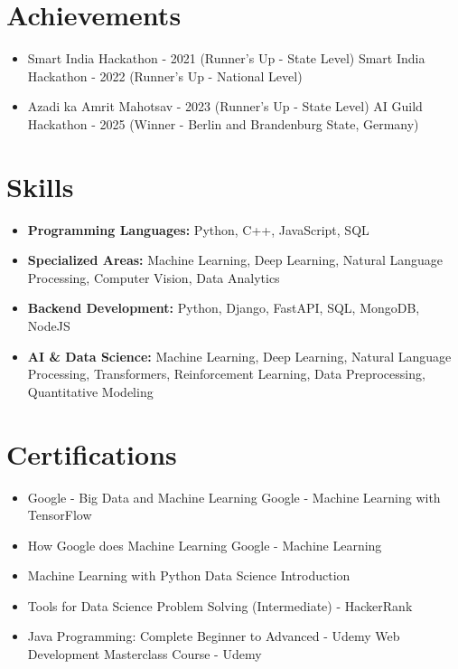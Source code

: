 \documentclass[a4paper,10pt]{article}
\begin{document}
\section*{Achievements}
\begin{itemize}
\item Smart India Hackathon - 2021 (Runner's Up - State Level) \hfill Smart India Hackathon - 2022 (Runner's Up - National Level)
\item Azadi ka Amrit Mahotsav - 2023 (Runner's Up - State Level) \hfill AI Guild Hackathon - 2025 (Winner - Berlin and Brandenburg State, Germany)
\end{itemize}

\section*{Skills}
\begin{itemize}
  \item \textbf{Programming Languages:} Python, C++, JavaScript, SQL
  \item \textbf{Specialized Areas:} Machine Learning, Deep Learning, Natural Language Processing, Computer Vision, Data Analytics
  \item \textbf{Backend Development:} Python, Django, FastAPI, SQL, MongoDB, NodeJS
  \item \textbf{AI \& Data Science:} Machine Learning, Deep Learning, Natural Language Processing, Transformers, Reinforcement Learning, Data Preprocessing, Quantitative Modeling
\end{itemize}

\section*{Certifications}
\begin{itemize}
\item Google - Big Data and Machine Learning \hfill Google - Machine Learning with TensorFlow
\item How Google does Machine Learning \hfill Google - Machine Learning
\item Machine Learning with Python \hfill Data Science Introduction
\item Tools for Data Science \hfill Problem Solving (Intermediate) - HackerRank
\item Java Programming: Complete Beginner to Advanced - Udemy \hfill Web Development Masterclass Course - Udemy
\end{itemize}
\end{document}
